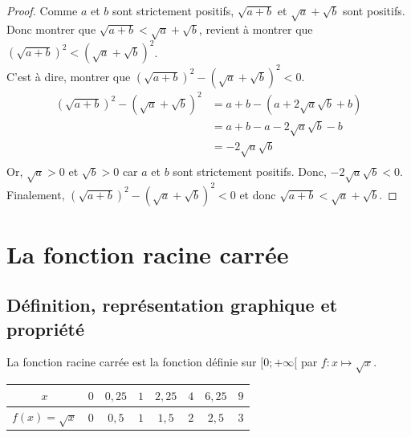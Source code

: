 \begin{proof}
Comme $a$ et $b$ sont strictement positifs, $\sqrt{a+b}$ et $ \sqrt{a} +\sqrt{b}$ sont positifs. \\
Donc montrer que $\sqrt{a+b} < \sqrt{a} +\sqrt{b}$, revient à montrer que $\left(\sqrt{a+b}\right)^2 < \left(\sqrt{a} +\sqrt{b}\right)^2$. \\
C'est à dire, montrer que $\left(\sqrt{a+b}\right)^2 -\left(\sqrt{a} +\sqrt{b}\right)^2 <0$. 
\begin{align*}
\left(\sqrt{a+b}\right)^2 -\left(\sqrt{a} +\sqrt{b}\right)^2 &= a+b -(a+2\sqrt{a}\sqrt{b}+b) \\
&=a+b -a-2\sqrt{a}\sqrt{b}-b \\
&=-2\sqrt{a}\sqrt{b}\\
\end{align*}
Or, $\sqrt{a}>0$ et $\sqrt{b}>0$ car $a$ et $b$ sont strictement positifs. Donc, $-2\sqrt{a}\sqrt{b}<0$.\\
Finalement, $\left(\sqrt{a+b}\right)^2 -\left(\sqrt{a} +\sqrt{b}\right)^2 <0$ et donc $\sqrt{a+b} < \sqrt{a} +\sqrt{b}$.


\end{proof}



\newpage

\section{La fonction racine carrée}
\subsection{Définition, représentation graphique et propriété}

\begin{Définition}
La fonction racine carrée est la fonction définie sur $[0;+\infty[$ par $f:x\mapsto \sqrt{x}$.

\end{Définition}

\begin{center}

\begin{tabular}{|c|c|c|c|c|c|c|c|}
\hline
$x$ & $0$ & $0,25$ & $1$ & $2,25$ & $4$ & $6,25$ & $9$ \\
\hline
$f(x)=\sqrt{x}$ & $0$ & $0,5$ & $1$ & $1,5$ & $2$ & $2,5$ & $3$ \\
\hline

\end{tabular}
\end{center}

